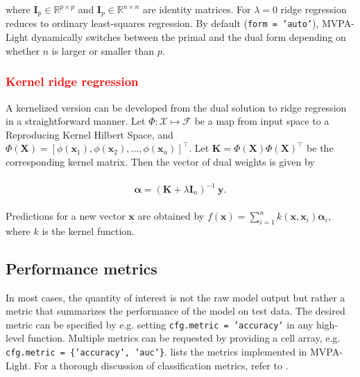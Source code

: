 \documentclass[utf8]{frontiersSCNS} %
\newcommand{\al}{\boldsymbol{\alpha}}
\newcommand{\x}{\mathbf{x}}
\newcommand{\y}{\mathbf{y}}
\newcommand{\I}{\mathbf{I}}
\newcommand{\K}{\mathbf{K}}
\newcommand{\R}{\mathbb{R}}
\newcommand{\X}{\mathbf{X}}
\newcommand{\ttt}[1]{\texttt{#1}}
\newcommand{\red}[1]{\textcolor{red}{#1}}
\begin{document}
where $\I_p\in\R^{p\times p}$ and $\I_p\in\R^{n\times n}$ are identity matrices. For $\lambda=0$ ridge regression reduces to ordinary least-squares regression. By default (\ttt{form = 'auto'}), MVPA-Light dynamically switches between the primal and the dual form depending on whether $n$ is larger or smaller than $p$.

\red{\subsubsection{Kernel ridge regression}}

A kernelized version can be developed from the dual solution to ridge regression in a straightforward manner. Let $\Phi:\mathcal{X}\mapsto\mathcal{F}$ be a map from input space to a Reproducing Kernel Hilbert Space, and $\Phi(\X) = [\phi(\x_1),\phi(\x_2),...,\phi(\x_n)]^\top$. Let $\K = \Phi(\X)\Phi(\X)^\top$ be the corresponding kernel matrix. Then the vector of dual weights is given by  

\begin{align}
\begin{split}
\label{eq:kernel_ridge}
\al = (\K + \lambda\I_n)^{-1}\ \y.
\end{split}
\end{align}

Predictions for a new vector $\x$ are obtained by $f(\x) = \sum_{i=1}^n k(\x, \x_i)\al_i$, where $k$ is the kernel function.


\subsection{Performance metrics}\label{sec:metrics}

In most cases, the quantity of interest is not the raw model output but rather a metric that summarizes the performance of the model on test data. The desired metric can be specified by e.g. setting \ttt{cfg.metric = 'accuracy'} in any high-level function. Multiple metrics can be requested by providing a cell array, e.g. \ttt{cfg.metric = \{'accuracy', 'auc'\}}.  lists the metrics implemented in MVPA-Light. For a thorough discussion of classification metrics, refer to  \cite{Sokolova2009ATasks}.
\end{document}

